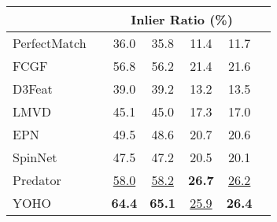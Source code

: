 \begin{table}[]
\begin{center}
{\begin{tabular}{lcccccc}
                        & \multicolumn{1}{l}{} & \multicolumn{4}{c}{Inlier Ratio (\%)}              \\ \hline
PerfectMatch\cite{smooth}    & \multicolumn{1}{l}{} & 36.0          & 35.8          & 11.4          & 11.7          \\
FCGF\cite{FCGF}              & \multicolumn{1}{l}{} & 56.8          & 56.2          & 21.4          & 21.6          \\
D3Feat\cite{d3feat}          & \multicolumn{1}{l}{} & 39.0          & 39.2          & 13.2          & 13.5          \\
LMVD\cite{li2020end}         & \multicolumn{1}{l}{} & 45.1          & 45.0          & 17.3          & 17.0          \\
EPN\cite{EPN}                & \multicolumn{1}{l}{} & 49.5          & 48.6          & 20.7          & 20.6          \\
SpinNet\cite{ao2020spinnet}  & \multicolumn{1}{l}{} & 47.5          & 47.2          & 20.5          & 20.1          \\
Predator\cite{predator}      & \multicolumn{1}{l}{} & \underline{58.0}    & \underline{58.2}    & \textbf{26.7} & \underline{26.2}    \\
YOHO                         & \multicolumn{1}{l}{} & \textbf{64.4} & \textbf{65.1} & \underline{25.9}    & \textbf{26.4} \\ \hline


\end{tabular}}
\end{center}
\end{table}
